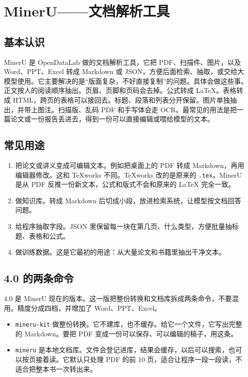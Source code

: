 \chapter{MinerU——文档解析工具}
\section{基本认识}
MinerU 是 OpenDataLab 做的文档解析工具，它把 PDF、扫描件、图片，以及 Word、PPT、Excel 转成 Markdown 或 JSON，方便后面检索、抽取，或交给大模型使用。它主要解决的是“版面复杂，不好直接复制”的问题。具体会做这些事。正文按人的阅读顺序抽出。页眉、页脚和页码会去掉。公式转成 LaTeX。表格转成 HTML，跨页的表格可以接回去。标题、段落和列表分开保留。图片单独抽出，并带上图注。扫描版、乱码 PDF 和手写体会走 OCR。最常见的用法是把一篇论文或一份报告丢进去，得到一份可以直接编辑或喂给模型的文本。

\section{常见用途}

\begin{enumerate}
\item 把论文或讲义变成可编辑文本。例如把桌面上的 PDF 转成 Markdown，再用编辑器修改。这和 TeXworks 不同。TeXworks 改的是原来的 \verb|.tex|。MinerU 是从 PDF 反推一份新文本，公式和版式不会和原来的 \LaTeX{} 完全一致。
\item 做知识库。转成 Markdown 后切成小段，放进检索系统，让模型按文档回答问题。
\item 给程序抽取字段。JSON 里保留每一块在第几页、什么类型，方便批量抽标题、表格和公式。
\item 做训练数据。这是它最初的用途：从大量论文和书籍里抽出干净文本。
\end{enumerate}

\section{4.0 的两条命令}
4.0 是 MinerU 现在的版本。这一版把整份转换和文档库拆成两条命令，不要混用。精度分成四档，并增加了 Word、PPT、Excel。

\begin{itemize}
\item \verb|mineru-kit| 做整份转换。它不建库，也不缓存。给它一个文件，它写出完整的 Markdown。要把 PDF 变成一份可以保存、可以编辑的稿子，用这条。
\item \verb|mineru| 是本地文档库。文件会登记进库，结果会缓存，以后可以搜索，也可以按页接着读。它默认只处理 PDF 的前 10 页，适合让程序一段一段读，不适合把整本书一次转出来。
\end{itemize}

